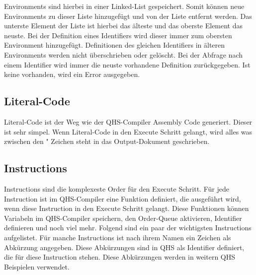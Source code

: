 Environments sind hierbei in einer Linked-List gespeichert. Somit können neue Environments zu dieser Liste hinzugefügt und von der Liste entfernt werden. Das unterste Element der Liste ist hierbei das älteste und das oberste Element das neuste.
Bei der Definition eines Identifiers wird dieser immer zum obersten Environment hinzugefügt. Definitionen des gleichen Identifiers in älteren Environments werden nicht überschrieben oder gelöscht.
Bei der Abfrage nach einem Identifier wird immer die neuste vorhandene Definition zurückgegeben. Ist keine vorhanden, wird ein Error ausgegeben.

\subsection{Literal-Code}
Literal-Code ist der Weg wie der QHS-Compiler Assembly Code generiert. Dieser ist sehr simpel. Wenn Literal-Code in den Execute Schritt gelangt, wird alles was zwischen den " Zeichen steht in das Output-Dokument geschrieben.

\subsection{Instructions}
Instructions sind die komplexeste Order für den Execute Schritt. Für jede Instruction ist im QHS-Compiler eine Funktion definiert, die ausgeführt wird, wenn diese Instruction in den Execute Schritt gelangt.
Diese Funktionen können Variabeln im QHS-Compiler speichern, den Order-Queue aktivieren, Identifier definieren und noch viel mehr. Folgend sind ein paar der wichtigsten Instructions aufgelistet.
Für manche Instructions ist nach ihrem Namen ein Zeichen als Abkürzung angegeben. Diese Abkürzungen sind in QHS als Identifier definiert, die für diese Instruction stehen. Diese Abkürzungen werden in weitern QHS Beispielen verwendet.

